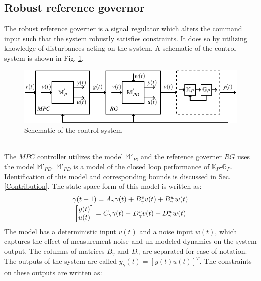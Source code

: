 \documentclass[letterpaper, 10 pt, conference]{ieeeconf}  %
\begin{document}
\begin{enumerate}
	\subsection{Robust reference governor}
	The robust reference governer is a signal regulator which alters the command input such that the system robustly satisfies constraints. It does so by utilizing knowledge of disturbances acting on the system. A schematic of the control system is shown in Fig. \ref{fullloop}. 
	\begin{figure}[h]
		\includegraphics[scale = 0.8]{withRG.pdf}
		\caption{Schematic of the control system}
		\label{fullloop}
	\end{figure} \\
	The $MPC$ controller utilizes the model $\mathbb{M}'_{P}$, and the reference governer $RG$ uses the model $\mathbb{M}'_{PD}$. $\mathbb{M}'_{PD}$ is a model of the closed loop performance of $\mathbb{K}_P$-$\mathbb{G}_P$. Identification of this model and corresponding bounds is discussed in Sec.\ref{Contribution}. The state space form of this model is written as:
	\begin{equation*}
	\begin{matrix}
	\gamma(t+1) = A_\gamma\gamma(t) + B^v_\gamma v(t) + B^w_\gamma w(t) \vspace{2pt}\\
	\begin{bmatrix}y(t)\\u(t)\end{bmatrix} = C_\gamma\gamma(t) + D^v_\gamma v(t) + D^w_\gamma w(t)
	\end{matrix}
	\end{equation*}
	The model has a deterministic input $v(t)$ and a noise input $w(t)$, which captures the effect of measurement noise and un-modeled dynamics on the system output. 
	The columns of matrices $B_\gamma$ and $D_\gamma$ are separated for ease of notation. The outputs of the system are called $y_{\gamma}(t)=[y(t) u(t)]^T$. The constraints on these outputs are written as: 
	\begin{equation*}
	\begin{matrix}
	\begin{matrix}

\end{matrix}
\end{matrix}
\end{equation*}
\end{enumerate}
\end{document}
